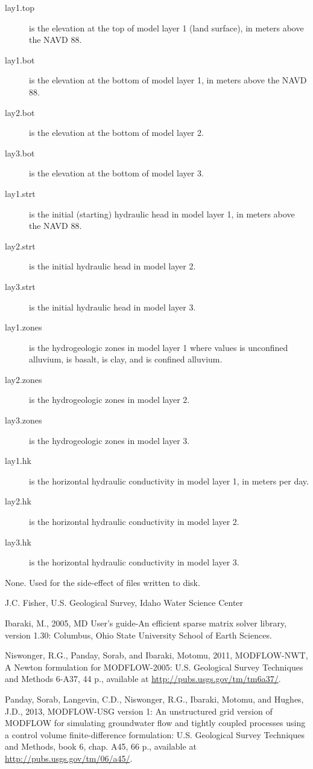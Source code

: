 \documentclass[a4paper]{book}
\begin{document}
\begin{Details}
\begin{description}
\item[lay1.top] is the elevation at the top of model layer 1 (land surface), in meters above the NAVD 88.
\item[lay1.bot] is the elevation at the bottom of model layer 1, in meters above the NAVD 88.
\item[lay2.bot] is the elevation at the bottom of model layer 2.
\item[lay3.bot] is the elevation at the bottom of model layer 3.
\item[lay1.strt] is the initial (starting) hydraulic head in model layer 1, in meters above the NAVD 88.
\item[lay2.strt] is the initial hydraulic head in model layer 2.
\item[lay3.strt] is the initial hydraulic head in model layer 3.
\item[lay1.zones] is the hydrogeologic zones in model layer 1 where values  is unconfined alluvium,  is basalt,  is clay, and  is confined alluvium.
\item[lay2.zones] is the hydrogeologic zones in model layer 2.
\item[lay3.zones] is the hydrogeologic zones in model layer 3.
\item[lay1.hk] is the horizontal hydraulic conductivity in model layer 1, in meters per day.
\item[lay2.hk] is the horizontal hydraulic conductivity in model layer 2.
\item[lay3.hk] is the horizontal hydraulic conductivity in model layer 3.

\end{description}

\end{Details}
%
\begin{Value}
None. Used for the side-effect of files written to disk.
\end{Value}
%
\begin{Author}\relax
J.C. Fisher, U.S. Geological Survey, Idaho Water Science Center
\end{Author}
%
\begin{References}\relax
Ibaraki, M., 2005, \eqn{\chi}{}MD User's guide-An efficient sparse matrix solver library, version 1.30: Columbus, Ohio State University School of Earth Sciences.

Niswonger, R.G., Panday, Sorab, and Ibaraki, Motomu, 2011, MODFLOW-NWT, A Newton formulation for MODFLOW-2005: U.S. Geological Survey Techniques and Methods 6-A37, 44 p., available at \url{http://pubs.usgs.gov/tm/tm6a37/}.

Panday, Sorab, Langevin, C.D., Niswonger, R.G., Ibaraki, Motomu, and Hughes, J.D., 2013, MODFLOW-USG version 1: An unstructured grid version of MODFLOW for simulating groundwater flow and tightly coupled processes using a control volume finite-difference formulation: U.S. Geological Survey Techniques and Methods, book 6, chap. A45, 66 p., available at \url{http://pubs.usgs.gov/tm/06/a45/}.
\end{References}
\end{document}

